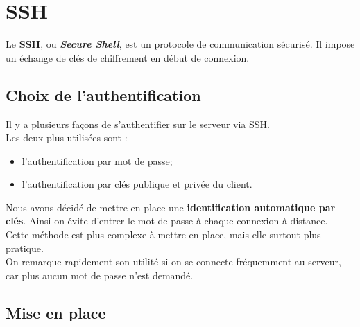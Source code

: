 \section{SSH}
\label{sec:ssh}

Le \textbf{SSH}, ou \textit{\textbf{Secure Shell}}, est un protocole de
communication sécurisé. Il impose un échange de clés de chiffrement en début de
connexion.


\subsection{Choix de l'authentification}
\label{subsec:choix-authentification}

Il y a plusieurs façons de s'authentifier sur le serveur via SSH. \\
Les deux plus utilisées sont :
\begin{itemize}
    \item l'authentification par mot de passe;
    \item l'authentification par clés publique et privée du client. \\
\end{itemize}

Nous avons décidé de mettre en place une \textbf{identification automatique par
clés}. Ainsi on évite d'entrer le mot de passe à chaque connexion à distance. \\
Cette méthode est plus complexe à mettre en place, mais elle surtout plus
pratique. \\

On remarque rapidement son utilité si on se connecte fréquemment au serveur, car
plus aucun mot de passe n'est demandé.


\subsection{Mise en place}
\label{subsec:mise-en-place}
